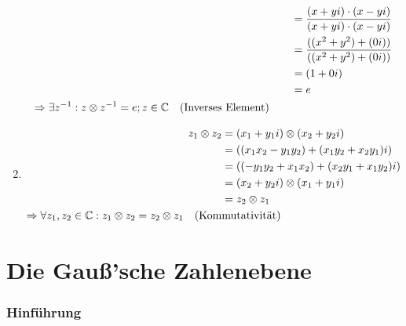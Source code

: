 \begin{Beweis}
\begin{enumerate}[1)]
\begin{align*}
								  			  	   &= \dfrac{(x + yi) \cdot (x - yi)}{(x + yi) \cdot (x - yi)} \\
												   &= \dfrac{((x^2 + y^2) + (0i))}{((x^2 + y^2) + (0i))} \\
											  	   &= (1 + 0i) \\
											  	   &= e \\
						\Rightarrow \exists z^{-1}: z \otimes z^{-1} = e; z \in \mathbb{C} \quad \text{(Inverses Element)} \qquad &
	  			  \end{align*}
			\item \begin{align*}
						z_1 \otimes z_2 &= (x_1 + y_1i) \otimes (x_2 + y_2i) \\
									    &= ((x_1x_2 - y_1y_2) + (x_1y_2 + x_2y_1)i) \\
									    &= ((- y_1y_2 + x_1x_2) + (x_2y_1 + x_1y_2)i) \\
									    &= (x_2 + y_2i) \otimes (x_1 + y_1i) \\
									    &= z_2 \otimes z_1 \\
						\Rightarrow \forall z_1, z_2 \in \mathbb{C}: z_1 \otimes z_2 = z_2 \otimes z_1 \quad \text{(Kom}&\text{mutativität)}
				  \end{align*}
		\end{enumerate}
	\end{Beweis}

	\newpage

\section{Die Gauß'sche Zahlenebene}


	\subsubsection{Hinführung}

